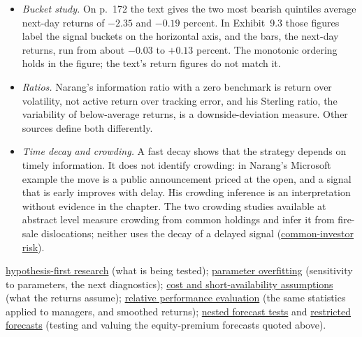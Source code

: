 \begin{qfmethod}
\begin{itemize}
With a monthly Sharpe ratio of 0.108, so $S^2=1.2$ percent, the earnings--price ratio's out-of-sample $R^2$ of 0.25 percent raises the average monthly return by $0.25/1.2=21$ percent. That is about 3 percent a year for unit risk aversion and 1 percent for risk aversion three (p.~10). So a monthly out-of-sample 0.05 would be twenty times their earnings--price figure, against an $S^2$ of about 0.012. The paper was published in the \emph{Review of Financial Studies} (2008).
\item \emph{Bucket study.} On p.~172 the text gives the two most bearish quintiles average next-day returns of $-2.35$ and $-0.19$ percent. In Exhibit~9.3 those figures label the signal buckets on the horizontal axis, and the bars, the next-day returns, run from about $-0.03$ to $+0.13$ percent. The monotonic ordering holds in the figure; the text's return figures do not match it.
\item \emph{Ratios.} Narang's information ratio with a zero benchmark is return over volatility, not active return over tracking error, and his Sterling ratio, the variability of below-average returns, is a downside-deviation measure. Other sources define both differently.
\item \emph{Time decay and crowding.} A fast decay shows that the strategy depends on timely information. It does not identify crowding: in Narang's Microsoft example the move is a public announcement priced at the open, and a signal that is early improves with delay. His crowding inference is an interpretation without evidence in the chapter. The two crowding studies available at abstract level measure crowding from common holdings and infer it from fire-sale dislocations; neither uses the decay of a delayed signal (\hyperref[def:common-investor-contagion]{common-investor risk}).
\end{itemize}

 \hyperref[meth:hypothesis-driven-strategy-research]{hypothesis-first research} (what is being tested); \hyperref[pit:parameter-overfitting]{parameter overfitting} (sensitivity to parameters, the next diagnostics); \hyperref[pit:backtest-cost-short-assumptions]{cost and short-availability assumptions} (what the returns assume); \hyperref[meth:relative-performance-evaluation]{relative performance evaluation} (the same statistics applied to managers, and smoothed returns); \hyperref[meth:nested-forecast-tests]{nested forecast tests} and \hyperref[meth:restricted-forecast-value]{restricted forecasts} (testing and valuing the equity-premium forecasts quoted above).

\end{qfmethod}

